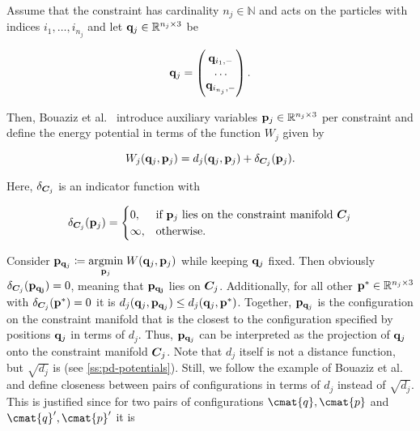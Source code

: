 Assume that the constraint has cardinality 
$n_j \in \mathbb{N}$ and acts on the particles with indices $i_1, \ldots, i_{n_j}$ and let $\mathbf{q}_j \in \mathbb{R}^{n_j \times 3}$ be

\[
    \mathbf{q}_j = \begin{pmatrix}
        \mathbf{q}_{i_1, -} \\
        \ldots \\
        \mathbf{q}_{i_{n_j}, -}
    \end{pmatrix}.
\]

\noindent Then, Bouaziz et al.\ \cite{bouaziz2014} introduce auxiliary variables $\mathbf{p}_j \in \mathbb{R}^{n_j \times 3}$ per constraint 
and define the energy potential in terms of the function $W_j$ given by 

\begin{equation}\label{eq:pd-Wj}
    W_j(\mathbf{q}_j, \mathbf{p}_j) = d_j(\mathbf{q}_j, \mathbf{p}_j) + \delta_{\bm{C}_j}(\mathbf{p}_j).
\end{equation}

\noindent Here, $\delta_{\bm{C}_j}$ is an indicator function with 

\[
\delta_{\bm{C}_j}(\mathbf{p}_j)= 
\begin{cases}
0,& \text{if } \mathbf{p}_j \text{ lies on the constraint manifold } \bm{C}_j \\
\infty,& \text{otherwise.}
\end{cases}
\]

\noindent Consider $\mathbf{p}_{\mathbf{q}_j} \coloneqq \underset{\mathbf{p}_j}{\operatorname{argmin}}\; W(\mathbf{q}_j, \mathbf{p}_j)$ while keeping $\mathbf{q}_j$ 
fixed. Then obviously 
$\delta_{\bm{C}_j}(\mathbf{p_{\mathbf{q}_j}}) = 0$, meaning that $\mathbf{p_{\mathbf{q}_j}}$ lies on $\bm{C}_j$. Additionally, 
for all other
$\mathbf{p}^* \in \mathbb{R}^{n_j \times 3}$ with $\delta_{\bm{C}_j}(\mathbf{p}^*) = 0$ it is $d_j(\mathbf{q}_j, \mathbf{p}_{\mathbf{q}_j}) 
\leq
d_j(\mathbf{q}_j, \mathbf{p}^*)$. Together, $\mathbf{p}_{\mathbf{q}_j}$ is the configuration on the constraint manifold that is the closest to 
the configuration specified by positions $\mathbf{q}_j$ in terms of $d_j$. Thus, $\mathbf{p}_{\mathbf{q}_j}$ can be 
interpreted as the projection of $\mathbf{q}_j$ onto the constraint manifold $\bm{C}_j$. Note that $d_j$ itself is not a distance 
function, but $\sqrt{d_j}$ is (see \cref{ss:pd-potentials}). Still, we follow the example of Bouaziz et al.\ \cite{bouaziz2014} 
and define closeness between pairs of configurations in terms of $d_j$ instead of $\sqrt{d_j}$. This is justified since for two pairs
of configurations $\cmat{q}, \cmat{p}$ and $\cmat{q}^\prime, \cmat{p}^\prime$ it is 

